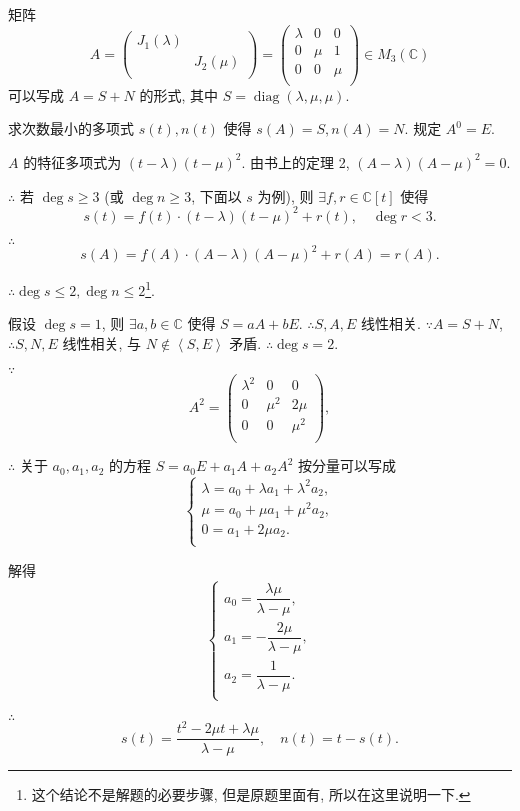 \documentclass{ctexart}
\begin{document}
\addtocounter{exercise}{2}
\begin{exercise}%
    矩阵
    \[A=\begin{pmatrix}
        J_1(\lambda) \\
        & J_2(\mu) \\
    \end{pmatrix}=\begin{pmatrix}
        \lambda & 0 & 0 \\
        0 & \mu & 1 \\
        0 & 0 & \mu \\
    \end{pmatrix}\in M_3(\mathbb{C})\]
    可以写成 $A=S+N$ 的形式, 其中 $S=\operatorname{diag}(\lambda,\mu,\mu)$.

    求次数最小的多项式 $s(t),n(t)$ 使得 $s(A)=S,n(A)=N$. 规定 $A^0=E$.
\end{exercise}
\begin{solution}
    $A$ 的特征多项式为 $(t-\lambda)(t-\mu)^2$. 由书上的定理 2, $(A-\lambda)(A-\mu)^2=0$.

    $\therefore$ 若 $\deg s\geq3$ (或 $\deg n\geq3$, 下面以 $s$ 为例), 则 $\exists f,r\in\mathbb{C}[t]$ 使得
    \[s(t)=f(t)\cdot(t-\lambda)(t-\mu)^2+r(t),\quad\deg r<3.\]

    $\therefore$
    \[s(A)=f(A)\cdot(A-\lambda)(A-\mu)^2+r(A)=r(A).\]

    $\therefore\deg s\leq 2,\deg n\leq 2$\footnote{这个结论不是解题的必要步骤, 但是原题里面有, 所以在这里说明一下.}.

    假设 $\deg s=1$, 则 $\exists a,b\in\mathbb{C}$ 使得 $S=aA+bE$. $\therefore S,A,E$ 线性相关. $\because A=S+N$, $\therefore S,N,E$ 线性相关, 与 $N\notin\left<S,E\right>$ 矛盾. $\therefore\deg s=2$.

    $\because$
    \[A^2=\begin{pmatrix}
        \lambda^2 & 0 & 0 \\
        0 & \mu^2 & 2\mu \\
        0 & 0 & \mu^2 \\
    \end{pmatrix},\]

    $\therefore$ 关于 $a_0,a_1,a_2$ 的方程 $S=a_0E+a_1A+a_2A^2$ 按分量可以写成
    \[\begin{cases}
        \lambda=a_0+\lambda a_1+\lambda^2a_2, \\
        \mu=a_0+\mu a_1+\mu^2a_2, \\
        0=a_1+2\mu a_2. \\
    \end{cases}\]

    解得
    \[\begin{cases}
        a_0=\dfrac{\lambda\mu}{\lambda-\mu}, \\[8pt]
        a_1=-\dfrac{2\mu}{\lambda-\mu}, \\[8pt]
        a_2=\dfrac{1}{\lambda-\mu}. \\
    \end{cases}\]

    $\therefore$
    \[s(t)=\dfrac{t^2-2\mu t+\lambda\mu}{\lambda-\mu},\quad n(t)=t-s(t).\]
\end{solution}
\end{document}
